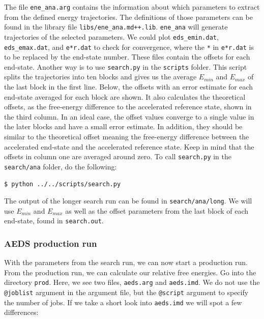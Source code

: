 The file \texttt{ene\_ana.arg} contains the information about which parameters to extract from the defined energy trajectories. The definitions of those parameters can be found in the library file \texttt{libs/ene\_ana.md++.lib}. \texttt{ene\_ana} will generate trajectories of the selected parameters. We could plot \texttt{eds\_emin.dat}, \texttt{eds\_emax.dat}, and \texttt{e*r.dat} to check for convergence, where the \texttt{*} in \texttt{e*r.dat} is to be replaced by the end-state number. These files contain the offsets for each end-state. Another way is to use \texttt{search.py} in the \texttt{scripts} folder. This script splits the trajectories into ten blocks and gives us the average $E_{min}$ and $E_{max}$ of the last block in the first line. Below, the offsets with an error estimate for each end-state averaged for each block are shown. It also calculates the theoretical offsets, as the free-energy difference to the accelerated reference state, shown in the third column. In an ideal case, the offset values converge to a single value in the later blocks and have a small error estimate. In addition, they should be similar to the theoretical offset meaning the free-energy difference between the accelerated end-state and the accelerated reference state. Keep in mind that the offsets in column one are averaged around zero.
To call \texttt{search.py} in the \texttt{search/ana} folder, do the following:

\begin{lstlisting}
$ python ../../scripts/search.py
\end{lstlisting}

The output of the longer search run can be found in \texttt{search/ana/long}.
We will use $E_{min}$ and $E_{max}$ as well as the offset parameters from the last block of each end-state, found in \texttt{search.out}.

\subsubsection{AEDS production run}
With the parameters from the search run, we can now start a production run. From the production run, we can calculate our relative free energies. Go into the directory \texttt{prod}. Here, we see two files, \texttt{aeds.arg} and \texttt{aeds.imd}. We do not use the \texttt{@joblist} argument in the argument file, but the \texttt{@script} argument to specify the number of jobs. If we take a short look into \texttt{aeds.imd} we will spot a few differences:

